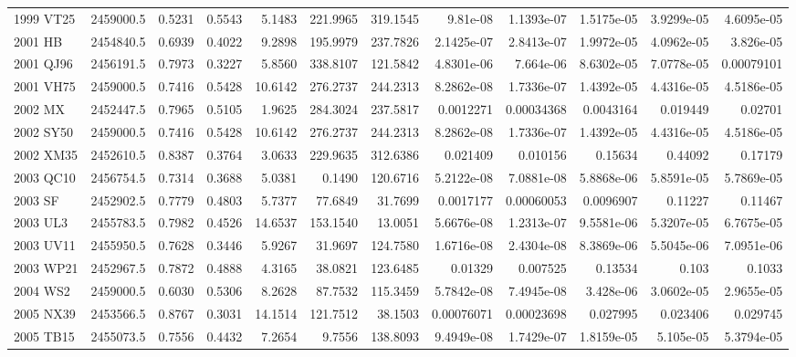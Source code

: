 \documentclass[letters,a4paper,fleqn,usenatbib]{mnras}
\begin{document}
\begin{table*}
{\begin{tabular}{lccrrrrrrrrr}
    1999 VT25  & 2459000.5 & 0.5231 & 0.5543 & 5.1483 & 221.9965 & 319.1545 & 9.81e-08   & 1.1393e-07 & 1.5175e-05 & 3.9299e-05 & 4.6095e-05 \\ 
    2001 HB    & 2454840.5 & 0.6939 & 0.4022 & 9.2898 & 195.9979 & 237.7826 & 2.1425e-07 & 2.8413e-07 & 1.9972e-05 & 4.0962e-05 & 3.826e-05  \\ 
    2001 QJ96  & 2456191.5 & 0.7973 & 0.3227 & 5.8560 & 338.8107 & 121.5842 & 4.8301e-06 & 7.664e-06  & 8.6302e-05 & 7.0778e-05 & 0.00079101 \\ 
    2001 VH75  & 2459000.5 & 0.7416 & 0.5428 & 10.6142 & 276.2737 & 244.2313 & 8.2862e-08 & 1.7336e-07 & 1.4392e-05 & 4.4316e-05 & 4.5186e-05 \\ 
    2002 MX    & 2452447.5 & 0.7965 & 0.5105 & 1.9625 & 284.3024 & 237.5817 & 0.0012271  & 0.00034368 & 0.0043164  & 0.019449   & 0.02701    \\ 
    2002 SY50  & 2459000.5 & 0.7416 & 0.5428 & 10.6142 & 276.2737 & 244.2313 & 8.2862e-08 & 1.7336e-07 & 1.4392e-05 & 4.4316e-05 & 4.5186e-05 \\ 
    2002 XM35  & 2452610.5 & 0.8387 & 0.3764 & 3.0633 & 229.9635 & 312.6386 & 0.021409   & 0.010156   & 0.15634    & 0.44092    & 0.17179    \\ 
    2003 QC10  & 2456754.5 & 0.7314 & 0.3688 & 5.0381 & 0.1490 & 120.6716 & 5.2122e-08 & 7.0881e-08 & 5.8868e-06 & 5.8591e-05 & 5.7869e-05 \\ 
    2003 SF    & 2452902.5 & 0.7779 & 0.4803 & 5.7377 & 77.6849 & 31.7699 & 0.0017177  & 0.00060053 & 0.0096907  & 0.11227    & 0.11467    \\ 
    2003 UL3   & 2455783.5 & 0.7982 & 0.4526 & 14.6537 & 153.1540 & 13.0051 & 5.6676e-08 & 1.2313e-07 & 9.5581e-06 & 5.3207e-05 & 6.7675e-05 \\ 
    2003 UV11  & 2455950.5 & 0.7628 & 0.3446 & 5.9267 & 31.9697 & 124.7580 & 1.6716e-08 & 2.4304e-08 & 8.3869e-06 & 5.5045e-06 & 7.0951e-06 \\ 
    2003 WP21  & 2452967.5 & 0.7872 & 0.4888 & 4.3165 & 38.0821 & 123.6485 & 0.01329    & 0.007525   & 0.13534    & 0.103      & 0.1033     \\ 
    2004 WS2   & 2459000.5 & 0.6030 & 0.5306 & 8.2628 & 87.7532 & 115.3459 & 5.7842e-08 & 7.4945e-08 & 3.428e-06  & 3.0602e-05 & 2.9655e-05 \\ 
    2005 NX39  & 2453566.5 & 0.8767 & 0.3031 & 14.1514 & 121.7512 & 38.1503 & 0.00076071 & 0.00023698 & 0.027995   & 0.023406   & 0.029745   \\ 
    2005 TB15  & 2455073.5 & 0.7556 & 0.4432 & 7.2654 & 9.7556 & 138.8093 & 9.4949e-08 & 1.7429e-07 & 1.8159e-05 & 5.105e-05  & 5.3794e-05 \\ 

\end{tabular}}
\end{table*}
\end{document}
